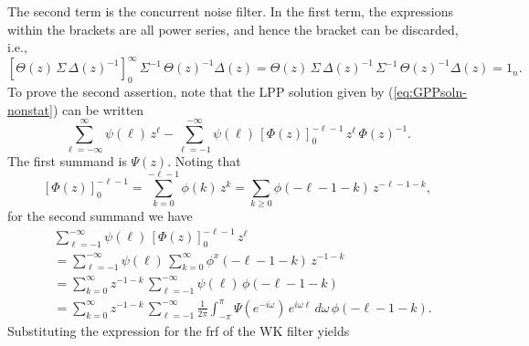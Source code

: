 \documentclass[a4paper]{book}
\begin{document}
  The second term is the concurrent noise filter.  In the first term,
  the expressions within the brackets are all power series, and hence
  the bracket can be discarded, i.e.,
\[
 { \left[  \Theta (z) \, \Sigma \, {\Delta (z)}^{-1} \right] }_0^{\infty}
 \, \Sigma^{-1} \, { \Theta (z) }^{-1} \Delta (z)
 =  \Theta (z) \, \Sigma \, {\Delta (z)}^{-1} 
 \, \Sigma^{-1} \, { \Theta (z) }^{-1} \Delta (z) = 1_n.
\]
To prove the second assertion, note that 
the LPP solution given by (\ref{eq:GPPsoln-nonstat}) can be written
\[
   \sum_{\ell = -\infty}^{\infty}  \psi  (\ell) \, z^{\ell} -  
 \sum_{\ell =-1}^{-\infty}  \psi  (\ell)  \,    
 { [  \Phi (z) ]}_0^{-\ell-1}     \, z^{\ell} \, { \Phi (z) }^{-1}.
\]
  The first summand is $\Psi (z)$.    Noting that
\[
    { [  \Phi (z) ]}_0^{-\ell-1}  =  \sum_{k=0}^{-\ell-1}  \phi (k) \, z^k =
   \sum_{k \geq 0}  \phi (-\ell-1-k) \, z^{-\ell-1-k},
\]
for the second summand we have
\begin{align*}
&  \sum_{\ell = -1}^{-\infty}  \psi  (\ell)   \, { [  \Phi (z) ]}_0^{-\ell-1} 
\, z^{\ell}   \\
& = \sum_{\ell = -1}^{-\infty}   \psi (\ell)   \,   \sum_{k = 0}^{\infty} 
  \phi^{x}  (-\ell-1-k) \, z^{-1-k} \\
 & =  \sum_{k = 0}^{\infty}    z^{-1-k} \, \sum_{\ell = -1}^{-\infty} \psi (\ell) \, 
   \phi  (-\ell-1-k)   \\
  & =  \sum_{k = 0}^{\infty}    z^{-1-k} \, \sum_{\ell = -1}^{-\infty} 
  \frac{1}{2 \pi} \int_{-\pi}^{\pi}  \Psi (e^{-i \omega}) \, e^{i \omega \ell} \, d\omega 
\,  \phi  (-\ell-1-k).
\end{align*}
Substituting the expression for the frf of the WK filter yields
\end{document}
